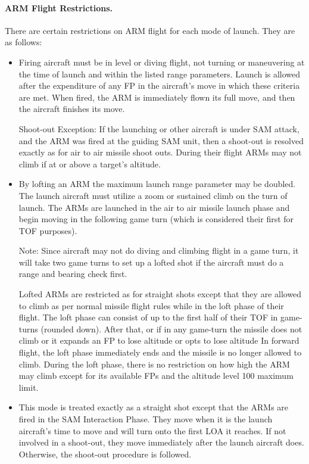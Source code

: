 \paragraph{ARM Flight Restrictions.} There are certain restrictions on ARM flight for each mode of launch. They are as follows:

\begin{itemize}

    \item{} Firing aircraft must be in level or diving flight, not turning or maneuvering at the time of launch and within the listed range parameters. Launch is allowed after the expenditure of any FP in the aircraft's move in which these criteria are met. When fired, the ARM is immediately flown its full move, and then the aircraft finishes its move.

    Shoot-out Exception: If the launching or other aircraft is under SAM attack, and the ARM was fired at the guiding SAM unit, then a shoot-out is resolved exactly as for air to air missile shoot outs. During their flight ARMs may not climb if at or above a target's altitude.

    \item{} By lofting an ARM the maximum launch range parameter may be doubled. The launch aircraft must utilize a zoom or sustained climb on the turn of launch. The ARMs are launched in the air to air missile launch phase and begin moving in the following game turn (which is considered their first for TOF purposes).

    Note: Since aircraft may not do diving and climbing flight in a game turn, it will take two game turns to set up a lofted shot if the aircraft must do a range and bearing check first.

    Lofted ARMs are restricted as for straight shots except that they are allowed to climb as per normal missile flight rules while in the loft phase of their flight. The loft phase can consist of up to the first half of their TOF in game-turns (rounded down). After that, or if in any game-turn the missile does not climb or it expands an FP to lose altitude or opts to lose altitude In forward flight, the loft phase immediately ends and the missile is no longer allowed to climb. During the loft phase, there is no restriction on how high the ARM may climb except for its available FPs and the altitude level 100 maximum limit.

    \item{} This mode is treated exactly as a straight shot except that the ARMs are fired in the SAM Interaction Phase. They move when it is the launch aircraft's time to move and will turn onto the first LOA it reaches. If not involved in a shoot-out, they move immediately after the launch aircraft does. Otherwise, the shoot-out procedure is followed.

\end{itemize}

